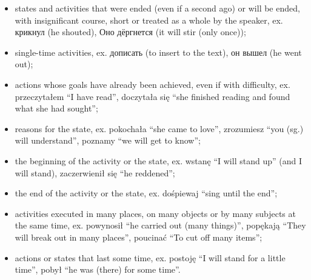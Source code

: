 \documentclass[12pt]{article}
\begin{document}
\begin{itemize}
\item  states and activities that were ended (even if a second ago) or will be ended, with insignificant course, short or treated as a whole by the speaker, ex. крикнул (he shouted), Оно дёргнется (it will stir (only once));
\item single-time activities, ex. дописать (to insert to the text), он вышел (he went out);
\item actions whose goals have already been achieved, even if with difficulty, ex. przeczytałem ``I have read'', doczytała się ``she finished reading and found what she had sought'';
\item reasons for the state, ex. pokochała ``she came to love'', zrozumiesz ``you (sg.) will understand'', poznamy ``we will get to know'';
\item the beginning of the activity or the state, ex. wstanę ``I will stand up'' (and I will stand), zaczerwienił się ``he reddened'';
\item the end of the activity or the state, ex. dośpiewaj ``sing until the end'';
\item activities executed in many places, on many objects or by many subjects at the same time, ex. powynosił ``he carried out (many things)'', popękają ``They will break out in many places'', poucinać ``To cut off many items'';
\item actions or states that last some time, ex. postoję ``I will stand for a little time'', pobył ``he was (there) for some time''.
\end{itemize}

\end{document}
